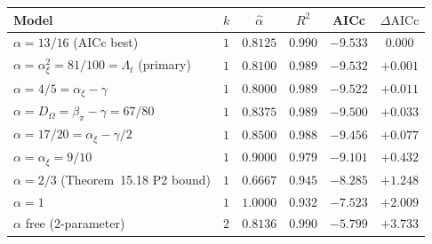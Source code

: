 \begin{tabular}{l c c c c c}
\toprule
Model & $k$ & $\hat\alpha$ & $R^{2}$ & AICc & $\Delta\mathrm{AICc}$ \\
\midrule
\textbf{$\alpha\!=\!13/16$} (AICc best) & $1$ & $0.8125$ & $0.990$ & $-9.533$ & $\mathbf{0.000}$ \\
\textbf{$\alpha\!=\!\alpha_{\xi}^{2}\!=\!81/100\!=\!\Lambda_{t}$} (primary) & $1$ & $0.8100$ & $0.989$ & $-9.532$ & $+0.001$ \\
$\alpha\!=\!4/5\!=\!\alpha_{\xi}\!-\!\gamma$ & $1$ & $0.8000$ & $0.989$ & $-9.522$ & $+0.011$ \\
$\alpha\!=\!D_{\Omega}\!=\!\beta_{\pi}\!-\!\gamma\!=\!67/80$ & $1$ & $0.8375$ & $0.989$ & $-9.500$ & $+0.033$ \\
$\alpha\!=\!17/20\!=\!\alpha_{\xi}\!-\!\gamma/2$ & $1$ & $0.8500$ & $0.988$ & $-9.456$ & $+0.077$ \\
$\alpha\!=\!\alpha_{\xi}\!=\!9/10$ & $1$ & $0.9000$ & $0.979$ & $-9.101$ & $+0.432$ \\
$\alpha\!=\!2/3$ (Theorem~15.18 P2 bound) & $1$ & $0.6667$ & $0.945$ & $-8.285$ & $+1.248$ \\
$\alpha\!=\!1$ & $1$ & $1.0000$ & $0.932$ & $-7.523$ & $+2.009$ \\
$\alpha$ free (2-parameter) & $2$ & $0.8136$ & $0.990$ & $-5.799$ & $+3.733$ \\
\bottomrule
\end{tabular}